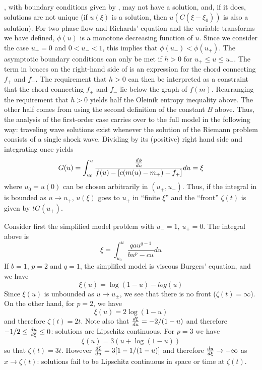 \documentclass[10pt,dvips,twoside,reqno]{amsart}
\begin{document}
, with boundary conditions given by
, may not have a solution, and, if
it does, solutions are not unique (if $u(\xi)$ is a solution, then
$u(C (\xi - \xi_0))$ is also a solution).  For two-phase flow and
Richards' equation and the variable transforms we have defined,
$\phi(u)$ is a monotone decreasing function of $u$.  Since we consider
the case $u_+ = 0$ and $0 < u_- <1$, this implies that $\phi(u_-) <
\phi(u_+)$.  The asymptotic boundary conditions can only be met if $h
> 0$ for $u_+ \leq u \leq u_-$.  The term in braces on the right-hand
side of  is an expression for the chord connecting $f_+$
and $f_-$. The requirement that $h>0$ can then be interpreted as a
constraint that the chord connecting $f_+$ and $f_-$ lie below the
graph of $f(m)$.  Rearranging the requirement that $h>0$ yields half
the Oleinik entropy inequality above. The other half comes from using
the second definition of the constant $B$ above.  Thus, the analysis
of the first-order case carries over to the full model in the
following way: traveling wave solutions exist whenever the solution of
the Riemann problem consists of a single shock wave. Dividing
 by its (positive) right hand side and integrating once
yields
\begin{equation}
  \label{eq:front}
  G(u) = \int^{u}_{u_0} \frac{\frac{d {\phi}}{d {u}}}{f(u) - \left[ c(m(u) - m_+) - f_+\right]} d u = \xi 
\end{equation}
where $u_0 = u(0)$ can be chosen arbitrarily in $(u_+,u_-)$. Thus, if
the integral in  is bounded as $u \rightarrow u_+$,
$u(\xi)$ goes to $u_+$ in ``finite $\xi$'' and the ``front''
$\zeta(t)$ is given by $tG(u_+)$.

Consider first the simplified model problem with $u_-=1$, $u_+=0$.
The integral above is
\begin{equation}
  \label{eq:simpModFront}
  \xi = \int^u_{u_0} \frac{q a u^{q-1}}{bu^p - c u} du
\end{equation}
If $b=1$, $p=2$ and $q=1$, the simplified model is viscous Burgers'
equation, and we have
\begin{equation}
  \label{eq:burgers}
  \xi(u) = \log(1-u) - log(u)
\end{equation}
Since $\xi(u)$ is unbounded as $u \rightarrow u_{\pm}$, we see that
there is no front ($\zeta(t)=\infty$). On the other hand, for $p=2$,
we have
\begin{equation}
  \label{eq:degenerateBurgers}
  \xi(u) = 2 \log(1-u)
\end{equation}
and therefore $\zeta(t) = 2t$. Note also that $\frac{d {\xi}}{d {u}} = -2/(1-u)$
and therefore $-1/2 \leq \frac{d {u}}{d {\xi}} \leq 0$: solutions are Lipschitz
continuous. For $p=3$ we have
\begin{equation}
  \label{eq:degenerateBurgers2}
  \xi(u) = 3(u + \log(1-u))
\end{equation}
so that $\zeta(t) = 3t$. However $\frac{d {\xi}}{d {u}} = 3[1 - 1/(1-u)]$ and
therefore $\frac{d {u}}{d {\xi}} \rightarrow -\infty$ as $x \rightarrow
\zeta(t)$: solutions fail to be Lipschitz continuous in space or time
at $\zeta(t)$.
\end{document}
